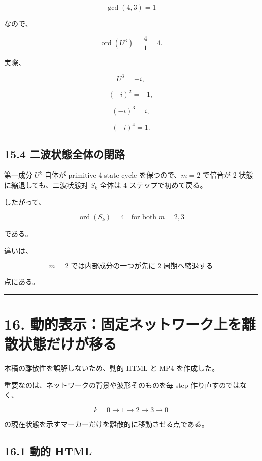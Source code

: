 \documentclass[
  a4paper,
]{ltjsarticle}
\begin{document}
\[
\gcd(4,3)=1
\]

なので、

\[
\operatorname{ord}(U^3)
=
\frac{4}{1}
=4.
\]

実際、

\[
U^3=-i,
\]

\[
(-i)^2=-1,
\]

\[
(-i)^3=i,
\]

\[
(-i)^4=1.
\]

\subsection{15.4
二波状態全体の閉路}\label{ux4e8cux6ce2ux72b6ux614bux5168ux4f53ux306eux9589ux8def}

第一成分 \(U^k\) 自体が primitive 4-state cycle を保つので、\(m=2\)
で倍音が 2 状態に縮退しても、二波状態対 \(S_k\) 全体は 4
ステップで初めて戻る。

したがって、

\[
\boxed{
\operatorname{ord}(S_k)=4
\quad\text{for both }m=2,3
}
\]

である。

違いは、

\[
\boxed{
\text{$m=2$ では内部成分の一つが先に 2 周期へ縮退する}
}
\]

点にある。

\begin{center}\rule{0.5\linewidth}{0.5pt}\end{center}

\section{16.
動的表示：固定ネットワーク上を離散状態だけが移る}\label{ux52d5ux7684ux8868ux793aux56faux5b9aux30cdux30c3ux30c8ux30efux30fcux30afux4e0aux3092ux96e2ux6563ux72b6ux614bux3060ux3051ux304cux79fbux308b}

本稿の離散性を誤解しないため、動的 HTML と MP4 を作成した。

重要なのは、ネットワークの背景や波形そのものを毎 step
作り直すのではなく、

\[
k=0\to1\to2\to3\to0
\]

の現在状態を示すマーカーだけを離散的に移動させる点である。

\subsection{16.1 動的 HTML}\label{ux52d5ux7684-html}
\end{document}
